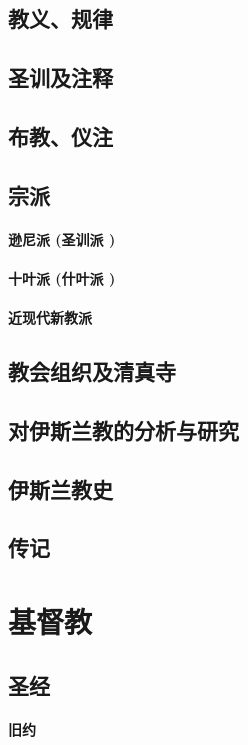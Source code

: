 \documentclass[UTF8]{../RepresentationUniverse}
\begin{document}
\section{教义、规律}
\section{圣训及注释}
\section{布教、仪注}
\section{宗派}
    \subsubsection{逊尼派 (圣训派 )}
    \subsubsection{十叶派 (什叶派 )}
    \subsubsection{近现代新教派}
\section{教会组织及清真寺}
\section{对伊斯兰教的分析与研究}
\section{伊斯兰教史}
\section{传记}



\chapter{基督教}
\section{圣经}
    \subsubsection{旧约}
\end{document}
